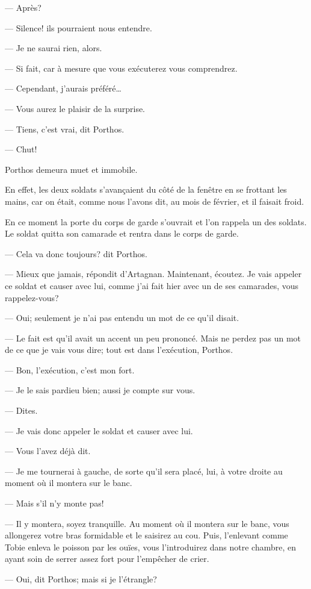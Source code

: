 — Après?

— Silence! ils pourraient nous entendre.

— Je ne saurai rien, alors.

— Si fait, car à mesure que vous exécuterez vous comprendrez.

— Cependant, j'aurais préféré\dots

— Vous aurez le plaisir de la surprise.

— Tiens, c'est vrai, dit Porthos.

— Chut!

Porthos demeura muet et immobile.

En effet, les deux soldats s'avançaient du côté de la fenêtre en se frottant les mains, car on était, comme nous l'avons dit, au mois de février, et il faisait froid.

En ce moment la porte du corps de garde s'ouvrait et l'on rappela un des soldats. Le soldat quitta son camarade et rentra dans le corps de garde.

— Cela va donc toujours? dit Porthos.

— Mieux que jamais, répondit d'Artagnan. Maintenant, écoutez. Je vais appeler ce soldat et causer avec lui, comme j'ai fait hier avec un de ses camarades, vous rappelez-vous?

— Oui; seulement je n'ai pas entendu un mot de ce qu'il disait.

— Le fait est qu'il avait un accent un peu prononcé. Mais ne perdez pas un mot de ce que je vais vous dire; tout est dans l'exécution, Porthos.

— Bon, l'exécution, c'est mon fort.

— Je le sais pardieu bien; aussi je compte sur vous.

— Dites.

— Je vais donc appeler le soldat et causer avec lui.

— Vous l'avez déjà dit.

— Je me tournerai à gauche, de sorte qu'il sera placé, lui, à votre droite au moment où il montera sur le banc.

— Mais s'il n'y monte pas!

— Il y montera, soyez tranquille. Au moment où il montera sur le banc, vous allongerez votre bras formidable et le saisirez au cou. Puis, l'enlevant comme Tobie enleva le poisson par les ouïes, vous l'introduirez dans notre chambre, en ayant soin de serrer assez fort pour l'empêcher de crier.

— Oui, dit Porthos; mais si je l'étrangle?

